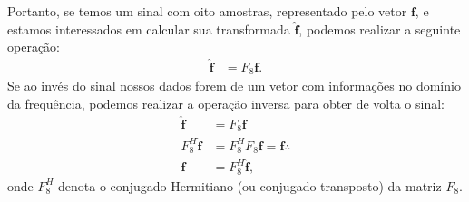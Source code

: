 Portanto, se temos um sinal com oito amostras, representado pelo vetor $\mathbf{f}$, e estamos interessados em calcular sua transformada $\mathbf{\hat{f}}$, podemos realizar a seguinte operação:
\vspace{-2mm}
\begin{align*}
\mathbf{\hat{f}} &= F_{8} \mathbf{f}.
\end{align*} 
Se ao invés do sinal nossos dados forem de um vetor com informações no domínio da frequência, podemos realizar a operação inversa para obter de volta o sinal:
\begin{align*}
\mathbf{\hat{f}} &= F_{8} \mathbf{f} \\
F_{8}^{H} \mathbf{\hat{f}} &= F_{8}^{H} F_{8}  \mathbf{f} = \mathbf{f} \therefore \\
\mathbf{f} &= F_{8}^{H} \mathbf{\hat{f}},
\end{align*} 
onde $F_{8}^{H}$ denota o conjugado Hermitiano (ou conjugado transposto) da matriz $F_{8}$.

